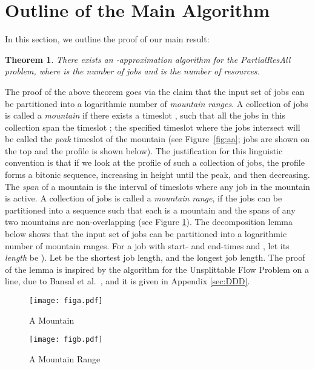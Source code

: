 \documentclass[11pt]{article}
\newtheorem{theorem}{Theorem}
\newcommand{\PResAll}{{\sc PartialResAll}}
\begin{document}
\section{Outline of the Main Algorithm}
\label{sec:overview}
In this section, we outline the proof of our main result:

\begin{theorem}
\label{thm:xAAA}
There exists an -approximation algorithm for the {\PResAll} problem,
where  is the number of jobs and  is the number of resources.
\end{theorem}

The proof of the above theorem goes via the claim that the input set of jobs can be 
partitioned into a logarithmic number of {\em mountain ranges}. 
A collection of jobs  is called a {\em mountain} if there exists a timeslot , such that
all the jobs in this collection span the timeslot ; the specified timeslot where the jobs 
intersect will be called the {\em peak} timeslot of the mountain (see Figure~\ref{fig:aa};
jobs are shown on the top and the profile is shown below).
The justification for this linguistic convention is that if we look at the profile of such a 
collection of jobs, the profile forms a bitonic sequence, increasing in height until the peak, and 
then decreasing. 
The {\em span} of a mountain is the interval of timeslots where any job in the mountain is active.  
A collection of jobs  is called a {\em mountain range}, if the jobs can be partitioned into 
a sequence  such that each  is a mountain and the spans of any two mountains 
are non-overlapping (see Figure \ref{fig:bb}).
The decomposition lemma below shows that the input set of jobs can be partitioned into a logarithmic number
of mountain ranges.  For a job  with 
start- and end-times  and , let its {\em length} be ). 
Let   be the shortest job length, and  the longest job length. 
The proof of the lemma is inspired by the algorithm for the Unsplittable Flow Problem on 
a line, due to Bansal et al.~\cite{BansalFKS09}, and it is given in Appendix \ref{sec:DDD}.

\begin{figure}[t!]
\begin{minipage}{0.4\linewidth}
\centering
\texttt{[image: figa.pdf]}
\caption{
A Mountain 
}
\label{fig:aa}
\end{minipage}
\centering
\begin{minipage}{0.55\linewidth}
\texttt{[image: figb.pdf]}
\caption{
A Mountain Range 
}
\label{fig:bb}
\end{minipage}
\end{figure}
\end{document}
